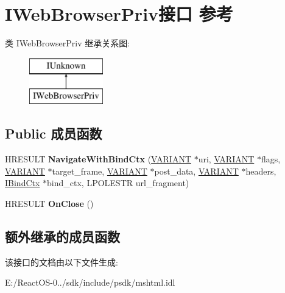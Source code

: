\hypertarget{interface_i_web_browser_priv}{}\section{I\+Web\+Browser\+Priv接口 参考}
\label{interface_i_web_browser_priv}
类 I\+Web\+Browser\+Priv 继承关系图\+:\begin{figure}[H]
\begin{center}
\leavevmode
\includegraphics[height=2.000000cm]{interface_i_web_browser_priv}
\end{center}
\end{figure}
\subsection*{Public 成员函数}
\begin{DoxyCompactItemize}
\item 
\mbox{\label{interface_i_web_browser_priv_a2dfd6e6f62732a72ecffb197272c79e4}} 
H\+R\+E\+S\+U\+LT {\bfseries Navigate\+With\+Bind\+Ctx} (\hyperlink{structtag_v_a_r_i_a_n_t}{V\+A\+R\+I\+A\+NT} $\ast$uri, \hyperlink{structtag_v_a_r_i_a_n_t}{V\+A\+R\+I\+A\+NT} $\ast$flags, \hyperlink{structtag_v_a_r_i_a_n_t}{V\+A\+R\+I\+A\+NT} $\ast$target\+\_\+frame, \hyperlink{structtag_v_a_r_i_a_n_t}{V\+A\+R\+I\+A\+NT} $\ast$post\+\_\+data, \hyperlink{structtag_v_a_r_i_a_n_t}{V\+A\+R\+I\+A\+NT} $\ast$headers, \hyperlink{interface_i_bind_ctx}{I\+Bind\+Ctx} $\ast$bind\+\_\+ctx, L\+P\+O\+L\+E\+S\+TR url\+\_\+fragment)
\item 
\mbox{\label{interface_i_web_browser_priv_a93a476c6c36af138b86b83a285fdef66}} 
H\+R\+E\+S\+U\+LT {\bfseries On\+Close} ()
\end{DoxyCompactItemize}
\subsection*{额外继承的成员函数}


该接口的文档由以下文件生成\+:\begin{DoxyCompactItemize}
\item 
E\+:/\+React\+O\+S-\/0../sdk/include/psdk/mshtml.\+idl\end{DoxyCompactItemize}
